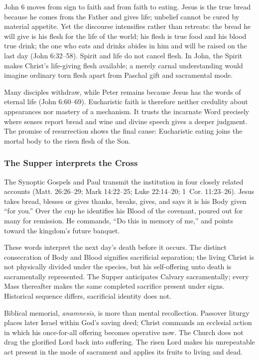 John 6 moves from sign to faith and from faith to eating. Jesus is the true bread because he comes from the Father and gives life; unbelief cannot be cured by material appetite. Yet the discourse intensifies rather than retreats: the bread he will give is his flesh for the life of the world; his flesh is true food and his blood true drink; the one who eats and drinks abides in him and will be raised on the last day (John 6:32--58). Spirit and life do not cancel flesh. In John, the Spirit makes Christ's life-giving flesh available; a merely carnal understanding would imagine ordinary torn flesh apart from Paschal gift and sacramental mode.

Many disciples withdraw, while Peter remains because Jesus has the words of eternal life (John 6:60--69). Eucharistic faith is therefore neither credulity about appearances nor mastery of a mechanism. It trusts the incarnate Word precisely where senses report bread and wine and divine speech gives a deeper judgment. The promise of resurrection shows the final cause: Eucharistic eating joins the mortal body to the risen flesh of the Son.

\subsubsection{The Supper interprets the Cross}

The Synoptic Gospels and Paul transmit the institution in four closely related accounts (Matt. 26:26--29; Mark 14:22--25; Luke 22:14--20; 1~Cor. 11:23--26). Jesus takes bread, blesses or gives thanks, breaks, gives, and says it is his Body given ``for you.'' Over the cup he identifies his Blood of the covenant, poured out for many for remission. He commands, ``Do this in memory of me,'' and points toward the kingdom's future banquet.

These words interpret the next day's death before it occurs. The distinct consecration of Body and Blood signifies sacrificial separation; the living Christ is not physically divided under the species, but his self-offering unto death is sacramentally represented. The Supper anticipates Calvary sacramentally; every Mass thereafter makes the same completed sacrifice present under signs. Historical sequence differs, sacrificial identity does not.

Biblical memorial, \emph{anamnesis}, is more than mental recollection. Passover liturgy places later Israel within God's saving deed; Christ commands an ecclesial action in which his once-for-all offering becomes operative now. The Church does not drag the glorified Lord back into suffering. The risen Lord makes his unrepeatable act present in the mode of sacrament and applies its fruits to living and dead.

